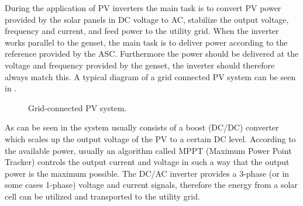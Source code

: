 During the application of PV inverters the main task is to convert PV power provided by the solar panels in DC voltage to AC, stabilize the output voltage, frequency and current, and feed power to the utility grid. When the inverter works parallel to the genset, the main task is to deliver power according to the reference provided by the ASC. Furthermore the power should be delivered at the voltage and frequency provided by the genset, the inverter should therefore always match this.
A typical diagram of a grid connected PV system can be seen in .    
\begin{figure}[H]
\caption{Grid-connected PV system.}
\label{fig:gridPV}
\end{figure}

As can be seen in  the system usually consists of a boost (DC/DC) converter which scales up the output voltage of the PV to a certain DC level. According to the available power, usually an algorithm called MPPT (Maximum Power Point Tracker) controls the output current and voltage in such a way that the output power is the maximum possible. The DC/AC inverter provides a 3-phase (or in some cases 1-phase) voltage and current signals, therefore the energy from a solar cell can be utilized and transported to the utility grid. 

